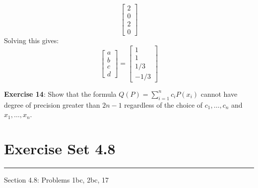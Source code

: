 \documentclass{article}
\begin{document}
\begin{answer}
\begin{equation*}
\begin{bmatrix}
                    2 \\
                    0 \\
                    2 \\
                    0   
                \end{bmatrix}
            \end{equation*}
        Solving this gives:
            \begin{equation*}
                \begin{bmatrix}
                    a \\
                    b \\
                    c \\
                    d   
                \end{bmatrix} = \begin{bmatrix}
                    1     \\
                    1     \\
                    1 / 3 \\
                    -1/ 3   
                \end{bmatrix}
            \end{equation*}
    \end{answer}


\textbf{Exercise 14}: Show that the formula $Q(P) = \sum_{i = 1}^{n} c_{i}P(x_{i})$ cannot have degree of precision greater than $2n - 1$ regardless of the choice of $c_{1}, \ldots, c_{n}$ and $x_{1}, \ldots, x_{n}$.

\newpage
\section*{Exercise Set 4.8}
\hrule

Section 4.8: Problems 1bc, 2bc, 17
\end{document}
